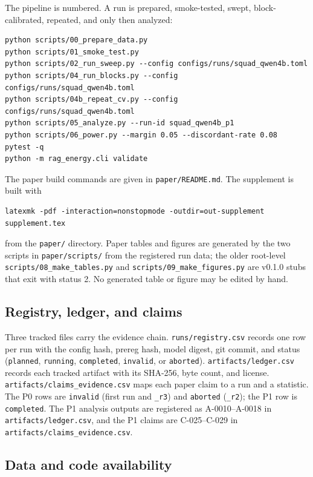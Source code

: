\documentclass[a4paper,fleqn]{cas-sc}
\begin{document}
The pipeline is numbered. A run is prepared, smoke-tested, swept, block-calibrated, repeated,
and only then analyzed:
\begin{verbatim}
python scripts/00_prepare_data.py
python scripts/01_smoke_test.py
python scripts/02_run_sweep.py --config configs/runs/squad_qwen4b.toml
python scripts/04_run_blocks.py --config configs/runs/squad_qwen4b.toml
python scripts/04b_repeat_cv.py --config configs/runs/squad_qwen4b.toml
python scripts/05_analyze.py --run-id squad_qwen4b_p1
python scripts/06_power.py --margin 0.05 --discordant-rate 0.08
pytest -q
python -m rag_energy.cli validate
\end{verbatim}
The paper build commands are given in \texttt{paper/README.md}. The supplement is built with
\begin{verbatim}
latexmk -pdf -interaction=nonstopmode -outdir=out-supplement supplement.tex
\end{verbatim}
from the \texttt{paper/} directory. Paper tables and figures are generated by the two scripts in
\texttt{paper/scripts/} from the registered run data; the older root-level
\texttt{scripts/08\_make\_tables.py} and \texttt{scripts/09\_make\_figures.py} are v0.1.0 stubs
that exit with status 2. No generated table or figure may be edited by hand.

\subsection{Registry, ledger, and claims}

Three tracked files carry the evidence chain. \texttt{runs/registry.csv} records one row per
run with the config hash, prereg hash, model digest, git commit, and status
(\texttt{planned}, \texttt{running}, \texttt{completed}, \texttt{invalid}, or \texttt{aborted}).
\texttt{artifacts/ledger.csv} records each tracked artifact with its SHA-256, byte count, and
license. \texttt{artifacts/claims\_evidence.csv} maps each paper claim to a run and a statistic.
The P0 rows are \texttt{invalid} (first run and \texttt{\_r3}) and \texttt{aborted}
(\texttt{\_r2}); the P1 row is \texttt{completed}. The P1 analysis outputs are registered as
A-0010--A-0018 in \texttt{artifacts/ledger.csv}, and the P1 claims are C-025--C-029 in
\texttt{artifacts/claims\_evidence.csv}.

\subsection{Data and code availability}
\end{document}
